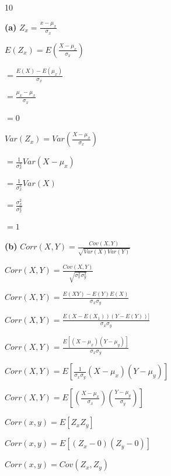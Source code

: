 \documentclass[12 pt]{article}
\begin{document}
    \begin{exercise}{10}
    \hfill

    \textbf{(a)} $Z_x = \frac{x - \mu_x}{\sigma_x}$

    $E(Z_x) = E(\frac{X - \mu_x}{\sigma_x})$

    $= \frac{E(X) - E(\mu_x)}{\sigma_x}$

    $= \frac{\mu_x - \mu_x}{\sigma_x}$

    $=0$

    \hfill

    $Var(Z_x) = Var(\frac{X - \mu_x}{\sigma_x})$

    $= \frac{1}{\sigma_x^2} Var(X - \mu_x)$

    $= \frac{1}{\sigma_x^2}Var(X)$

    $= \frac{\sigma_x^2}{\sigma_x^2}$

    $= 1$

    \hfill

    \textbf{(b)}
    $Corr(X,Y) = \frac{Cov(X,Y)}{\sqrt{Var(X)Var(Y)}}$

    $Corr(X,Y) = \frac{Cov(X,Y)}{\sqrt{\sigma_x^2 \sigma_y^2}}$

    $Corr(X,Y) = \frac{E(XY) - E(Y)E(X)}{\sigma_x \sigma_y}$

    $Corr(X,Y) = \frac{E(X-E(X_1))(Y - E(Y))]}{\sigma_x \sigma_y}$

    $Corr(X,Y) = \frac{E[(X- \mu_x)(Y - \mu_y)]}{\sigma_x \sigma_y}$

    $Corr(X,Y) = E[\frac{1}{\sigma_x \sigma_y}(X - \mu_x)(Y - \mu_y)]$

    $Corr(X,Y) = E[(\frac{X - \mu_x}{\sigma_x})(\frac{Y - \mu_y}{\sigma_y})]$

    $Corr(x,y) = E[Z_x Z_y]$

    $Corr(x,y) = E[(Z_x - 0)(Z_y - 0)]$

    $Corr(x,y) = Cov(Z_x, Z_y)$

    \hfill
    \end{exercise}
\end{document}
